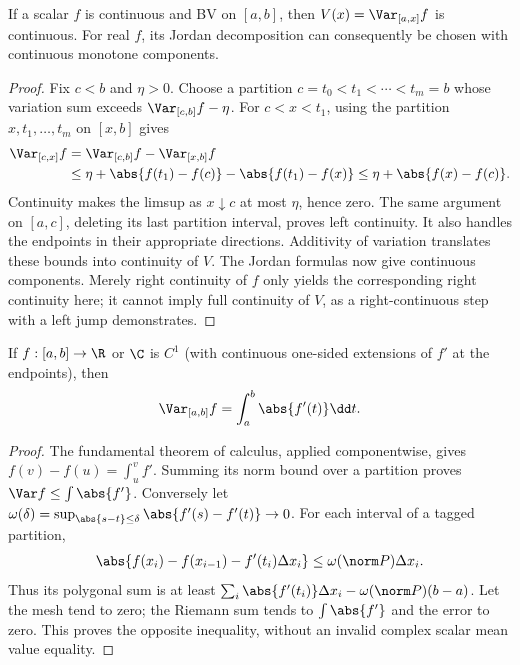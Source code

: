 \begin{theorem}
If a scalar $f$ is continuous and BV on $[a,b]$, then $V(x)=\Var_{[a,x]}f$ is continuous. For real $f$, its Jordan decomposition can consequently be chosen with continuous monotone components.
\end{theorem}
\begin{proof}
Fix $c<b$ and $\eta>0$. Choose a partition $c=t_0<t_1<\cdots<t_m=b$ whose variation sum exceeds $\Var_{[c,b]}f-\eta$. For $c<x<t_1$, using the partition $x,t_1,\ldots,t_m$ on $[x,b]$ gives
\[\begin{split}\Var_{[c,x]}f&=\Var_{[c,b]}f-\Var_{[x,b]}f\\
&\leq\eta+\abs{f(t_1)-f(c)}-\abs{f(t_1)-f(x)}\leq\eta+\abs{f(x)-f(c)}.
\end{split}\]
Continuity makes the limsup as $x\downarrow c$ at most $\eta$, hence zero. The same argument on $[a,c]$, deleting its last partition interval, proves left continuity. It also handles the endpoints in their appropriate directions. Additivity of variation translates these bounds into continuity of $V$. The Jordan formulas now give continuous components. Merely right continuity of $f$ only yields the corresponding right continuity here; it cannot imply full continuity of $V$, as a right-continuous step with a left jump demonstrates.
\end{proof}

\begin{theorem}
If $f:[a,b]\to\R$ or $\C$ is $C^1$ (with continuous one-sided extensions of $f'$ at the endpoints), then
\[\Var_{[a,b]}f=\int_a^b\abs{f'(t)}\dd t.\]
\end{theorem}
\begin{proof}
The fundamental theorem of calculus, applied componentwise, gives $f(v)-f(u)=\int_u^v f'$. Summing its norm bound over a partition proves $\Var f\leq\int\abs{f'}$. Conversely let $\omega(\delta)=\sup_{\abs{s-t}\leq\delta}\abs{f'(s)-f'(t)}\to0$. For each interval of a tagged partition,
\[\abs{f(x_i)-f(x_{i-1})-f'(t_i)\Delta x_i}\leq\omega(\norm P)\Delta x_i.\]
Thus its polygonal sum is at least $\sum_i\abs{f'(t_i)}\Delta x_i-\omega(\norm P)(b-a)$. Let the mesh tend to zero; the Riemann sum tends to $\int\abs{f'}$ and the error to zero. This proves the opposite inequality, without an invalid complex scalar mean value equality.
\end{proof}

